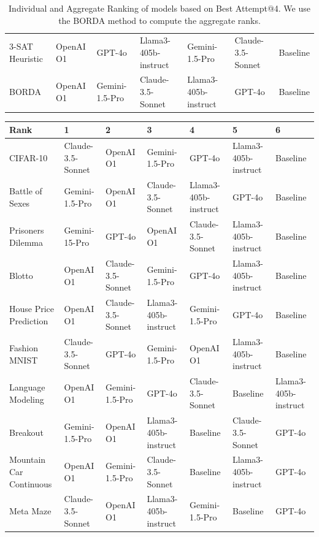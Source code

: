 \documentclass[]{fairmeta}
\begin{document}
\begin{table}[!htb]
\begin{adjustbox}{width=\textwidth}
\begin{NiceTabular}{lllllll}
        3-SAT Heuristic & OpenAI O1 & GPT-4o & Llama3-405b-instruct & Gemini-1.5-Pro & Claude-3.5-Sonnet & Baseline \\
        BORDA & OpenAI O1 & Gemini-1.5-Pro & Claude-3.5-Sonnet & Llama3-405b-instruct & GPT-4o & Baseline \\
        \bottomrule
    \end{NiceTabular}
    \end{adjustbox}
    \caption{Individual and Aggregate Ranking of models based on Best Attempt@4. We use the BORDA method to compute the aggregate ranks.}
    \label{tab:ba_ranks}
\end{table}

\begin{table}[!htb]
    \centering
    \begin{adjustbox}{width=\textwidth}
    \begin{NiceTabular}{lllllll}
        \toprule
        Rank & 1 & 2 & 3 & 4 & 5 & 6 \\
        \midrule
        CIFAR-10 & Claude-3.5-Sonnet & OpenAI O1 & Gemini-1.5-Pro & GPT-4o & Llama3-405b-instruct & Baseline \\
        Battle of Sexes & Gemini-1.5-Pro & OpenAI O1 & Claude-3.5-Sonnet & Llama3-405b-instruct & GPT-4o & Baseline \\
        Prisoners Dilemma & Gemini-15-Pro & GPT-4o & OpenAI O1 & Claude-3.5-Sonnet & Llama3-405b-instruct & Baseline \\
        Blotto & OpenAI O1 & Claude-3.5-Sonnet & Gemini-1.5-Pro & GPT-4o & Llama3-405b-instruct & Baseline \\
        House Price Prediction & OpenAI O1 & Claude-3.5-Sonnet & Llama3-405b-instruct & Gemini-1.5-Pro & GPT-4o & Baseline \\
        Fashion MNIST & Claude-3.5-Sonnet & GPT-4o & Gemini-1.5-Pro & OpenAI O1 & Llama3-405b-instruct & Baseline \\
        Language Modeling & OpenAI O1 & Gemini-1.5-Pro & GPT-4o & Claude-3.5-Sonnet & Baseline & Llama3-405b-instruct \\
        Breakout & Gemini-1.5-Pro & OpenAI O1 & Llama3-405b-instruct & Baseline & Claude-3.5-Sonnet & GPT-4o \\
        Mountain Car Continuous & OpenAI O1 & Gemini-1.5-Pro & Claude-3.5-Sonnet & Baseline & Llama3-405b-instruct & GPT-4o \\
        Meta Maze & Claude-3.5-Sonnet & OpenAI O1 & Llama3-405b-instruct & Gemini-1.5-Pro & Baseline & GPT-4o \\

\end{NiceTabular}
\end{adjustbox}
\end{table}
\end{document}
